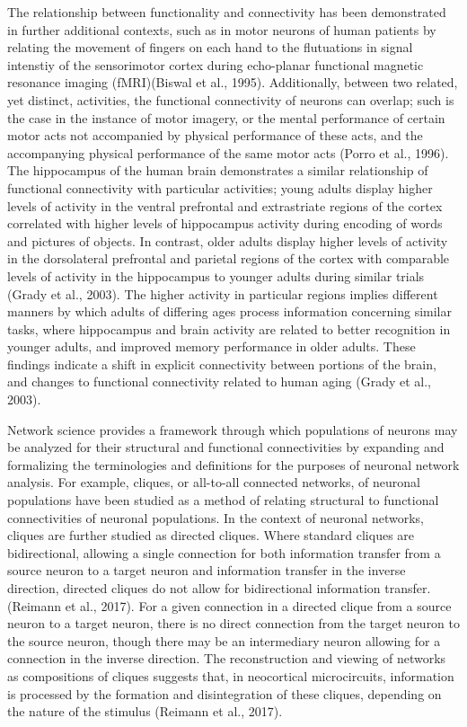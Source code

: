 \documentclass[11pt]{article}
\begin{document}
The relationship between functionality and connectivity has been demonstrated in further additional contexts, such as in motor neurons of human patients by relating the movement of fingers on each hand to the flutuations in signal intenstiy of the sensorimotor cortex during echo-planar functional magnetic resonance imaging (fMRI)(Biswal et al., 1995). Additionally, between two related, yet distinct, activities, the functional connectivity of neurons can overlap; such is the case in the instance of motor imagery, or the mental performance of certain motor acts not accompanied by physical performance of these acts, and the accompanying physical performance of the same motor acts (Porro et al., 1996). The hippocampus of the human brain demonstrates a similar relationship of functional connectivity with particular activities; young adults display higher levels of activity in the ventral prefrontal and extrastriate regions of the cortex correlated with higher levels of hippocampus activity during  encoding of words and pictures of objects. In contrast, older adults display higher levels of activity in the dorsolateral prefrontal and parietal regions of the cortex with comparable levels of activity in the hippocampus to younger adults during similar trials (Grady et al., 2003). The higher activity in particular regions implies different manners by which adults of differing ages process information concerning similar tasks, where hippocampus and brain activity are related to better recognition in younger adults, and improved memory performance in older adults. These findings indicate a shift in explicit connectivity between portions of the brain, and changes to functional connectivity related to human aging (Grady et al., 2003).\par

Network science provides a framework through which populations of neurons may be analyzed for their structural and functional connectivities by expanding and formalizing the terminologies and definitions for the purposes of neuronal network analysis. For example, cliques, or all-to-all connected networks, of neuronal populations have been studied as a method of relating structural to functional connectivities of neuronal populations. In the context of neuronal networks, cliques are further studied as directed cliques. Where standard cliques are bidirectional, allowing a single connection for both information transfer from a source neuron to a target neuron and information transfer in the inverse direction, directed cliques do not allow for bidirectional information transfer. (Reimann et al., 2017). For a given connection in a directed clique from a source neuron to a target neuron, there is no direct connection from the target neuron to the source neuron, though there may be an intermediary neuron allowing for a connection in the inverse direction. The reconstruction and viewing of networks as compositions of cliques suggests that, in neocortical microcircuits, information is processed by the formation and disintegration of these cliques, depending on the nature of the stimulus (Reimann et al., 2017).\par
\end{document}
